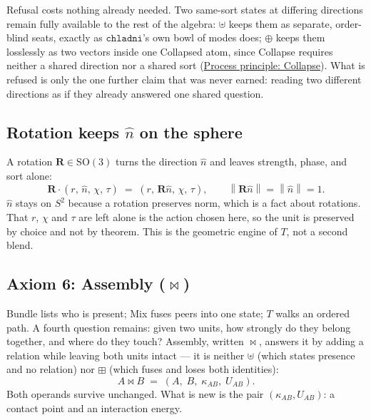 \documentclass[12pt, a4paper]{article}
\providecommand{\norm}[1]{\left\lVert#1\right\rVert}
\begin{document}
Refusal costs nothing already needed. Two same-sort states at
differing directions remain fully available to the rest of the
algebra: $\uplus$ keeps them as separate, order-blind seats, exactly
as $\mathtt{chladni}$'s own bowl of modes does; $\oplus$ keeps them
losslessly as two vectors inside one Collapsed atom, since Collapse requires neither a shared direction nor a shared sort (\hyperref[subsec:process_principle_collapse]{Process principle: Collapse}). What is refused is only the one
further claim that was never earned: reading two different
directions as if they already answered one shared question.

\subsection{Rotation keeps \texorpdfstring{$\hat n$}{n} on the sphere}
\label{subsec:axiom_rotation}
A rotation $\mathbf{R} \in \mathrm{SO}(3)$ turns the direction $\hat n$ and leaves strength, phase, and sort alone:
\begin{equation}
    \mathbf{R}\cdot(r,\,\hat n,\,\chi,\,\tau)
    \;=\;
    (r,\,\mathbf{R}\hat n,\,\chi,\,\tau),
    \qquad
    \norm{\mathbf{R}\hat n} = \norm{\hat n} = 1.
\end{equation}
$\hat n$ stays on $S^2$ because a rotation preserves norm, which is a fact about rotations. That $r$, $\chi$ and $\tau$ are left alone is the action chosen here, so the unit is preserved by choice and not by theorem. This is the geometric engine of $T$, not a second blend.

\subsection{Axiom 6: Assembly (\texorpdfstring{$\bowtie$}{assembly})}
\label{subsec:axiom_assembly}
Bundle lists who is present; Mix fuses peers into one state; $T$
walks an ordered path. A fourth question remains: given two units,
how strongly do they belong together, and where do they touch?
Assembly, written $\bowtie$, answers it by adding a relation while
leaving both units intact --- it is neither $\uplus$ (which states
presence and no relation) nor $\boxplus$ (which fuses and loses both
identities):
\begin{equation}
    A \bowtie B \;=\; (A,\;B,\;\kappa_{AB},\;U_{AB}).
    \label{eq:assembly_signature}
\end{equation}
Both operands survive unchanged. What is new is the pair
$(\kappa_{AB}, U_{AB})$: a contact point and an interaction energy.
\end{document}
